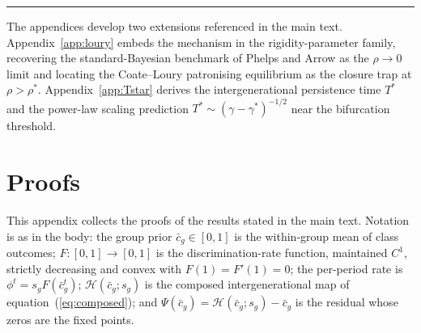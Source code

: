 \documentclass[pdflatex,sn-basic]{sn-jnl}
\theoremstyle{thmstyleone}
\numberwithin{proposition}{subsection}
\begin{document}
\bigskip
\noindent\rule{\textwidth}{0.4pt}
\medskip

\noindent The appendices develop two extensions referenced in the
main text. Appendix~\ref{app:loury} embeds the mechanism in the
rigidity-parameter family, recovering the standard-Bayesian benchmark of
Phelps and Arrow as the $\rho \to 0$ limit and locating the Coate--Loury
patronising equilibrium as the closure trap at $\rho > \rho^*$.
Appendix~\ref{app:Tstar} derives the
intergenerational persistence time $T^*$ and the power-law scaling
prediction $T^* \sim (\gamma - \gamma^*)^{-1/2}$ near the
bifurcation threshold.

\appendix

\section{Proofs}
\label{app:proofs}

This appendix collects the proofs of the results stated in the main
text. Notation is as in the body: the group prior $\bar{c}_g \in [0,1]$
is the within-group mean of class outcomes; $F:[0,1]\to[0,1]$ is the
discrimination-rate function, maintained $C^1$, strictly decreasing and
convex with $F(1)=F'(1)=0$; the per-period
rate is $\phi^t = s_g F(\bar{c}_g^t)$; $\mathcal{H}(\bar{c}_g; s_g)$ is the
composed intergenerational map of equation~(\ref{eq:composed}); and
$\Psi(\bar{c}_g) = \mathcal{H}(\bar{c}_g; s_g) - \bar{c}_g$ is the residual
whose zeros are the fixed points.
\end{document}
